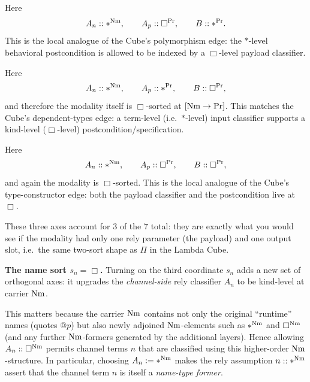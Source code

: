\documentclass[11pt]{article}
\theoremstyle{definition}
\theoremstyle{plain}
\theoremstyle{remark}
\theoremstyle{plain}
\newcommand{\Boxsort}{\Box}
\newcommand{\astsort}{\ast}
\renewcommand{\Pr}{{\rm Pr}}
\newcommand{\Nm}{{\rm Nm}}
\begin{document}
\begin{description}[leftmargin=2.7em,style=nextline]
\item[Axis \(p\): polymorphism \((\Boxsort,\astsort)\) on \((s_p,s_{\rm out})\).]
Here
\[
  A_n :: *^{\Nm},\qquad A_p :: \Box^{\Pr},\qquad B :: *^{\Pr}.
\]
This is the local analogue of the Cube's polymorphism edge: the \(\astsort\)-level behavioral
postcondition is allowed to be indexed by a \(\Boxsort\)-level payload classifier.

\item[Axis \(B\): dependent types \((\astsort,\Boxsort)\) on \((s_p,s_{\rm out})\).]
Here
\[
  A_n :: *^{\Nm},\qquad A_p :: *^{\Pr},\qquad B :: \Box^{\Pr},
\]
and therefore the modality itself is \(\Boxsort\)-sorted at \([\Nm\to\Pr]\).
This matches the Cube's dependent-types edge: a term-level (i.e.\ \(\astsort\)-level) input classifier
supports a kind-level (\(\Boxsort\)-level) postcondition/specification.

\item[Axis \(pB\): type constructors \((\Boxsort,\Boxsort)\) on \((s_p,s_{\rm out})\).]
Here
\[
  A_n :: *^{\Nm},\qquad A_p :: \Box^{\Pr},\qquad B :: \Box^{\Pr},
\]
and again the modality is \(\Boxsort\)-sorted.
This is the local analogue of the Cube's type-constructor edge: both the payload classifier and the
postcondition live at \(\Boxsort\).
\end{description}

These three axes account for \(3\) of the \(7\) total: they are exactly what you would see if the modality
had only one rely parameter (the payload) and one output slot, i.e.\ the same two-sort shape as \(\Pi\) in
the Lambda Cube.

\medskip

\noindent\textbf{The name sort \(s_n=\Boxsort\).}
Turning on the third coordinate \(s_n\) adds a new set of orthogonal axes: it upgrades the \emph{channel-side}
rely classifier \(A_n\) to be kind-level at carrier \(\Nm\).

This matters because the carrier \(\Nm\) contains not only the original
``runtime'' names (quotes \( @p \)) but also newly adjoined \(\Nm\)-elements such as \( *^{\Nm}\) and
\(\Box^{\Nm}\) (and any further \(\Nm\)-formers generated by the additional layers).  Hence allowing
\(A_n::\Box^{\Nm}\) permits channel terms \(n\) that are classified using this higher-order \(\Nm\)-structure.
In particular, choosing \(A_n := *^{\Nm}\) makes the rely assumption \(n::*^{\Nm}\) assert that the channel
term \(n\) is itself a \emph{name-type former}.
\end{document}
